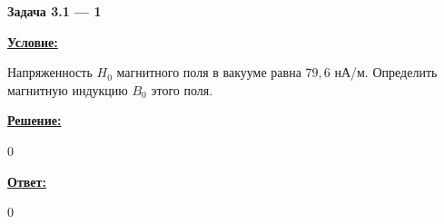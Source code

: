 
\begin{center}
    \textbf{Задача 3.1 --- 1}
\end{center}

\underline{\textbf{Условие:}}

Напряженность $ H_0 $ магнитного поля в вакууме равна $ 79,6 $ нА/м.
Определить магнитную индукцию $ B_0 $ этого поля.

\underline{\textbf{Решение:}}

0

\underline{\textbf{Ответ:}}

0

